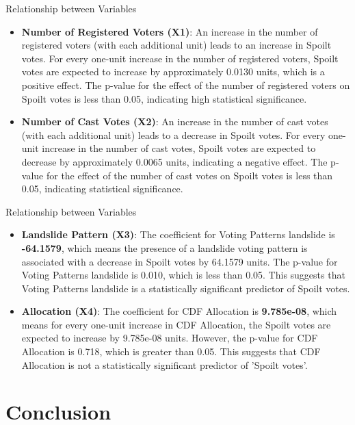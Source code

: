 \documentclass{beamer}
\begin{document}
\begin{frame}{Relationship between Variables}
\begin{itemize}
\item \textbf{Number of Registered Voters (X1)}:
An increase in the number of registered voters (with each additional unit) leads to an increase in Spoilt votes. For every one-unit increase in the number of registered voters, Spoilt votes are expected to increase by approximately 0.0130 units, which is a positive effect. The p-value for the effect of the number of registered voters on Spoilt votes is less than 0.05, indicating high statistical significance.
\item \textbf{Number of Cast Votes (X2)}:
An increase in the number of cast votes (with each additional unit) leads to a decrease in Spoilt votes. For every one-unit increase in the number of cast votes, Spoilt votes are expected to decrease by approximately 0.0065 units, indicating a negative effect. The p-value for the effect of the number of cast votes on Spoilt votes is less than 0.05, indicating statistical significance.
\end{itemize}
\end{frame}

\begin{frame}{Relationship between Variables}
\begin{itemize}
\item \textbf{Landslide Pattern (X3)}: The coefficient for Voting Patterns landslide is \textbf{-64.1579}, which means the presence of a landslide voting pattern is associated with a decrease in Spoilt votes by 64.1579 units. The p-value for Voting Patterns landslide is 0.010, which is less than 0.05. This suggests that Voting Patterns landslide is a statistically significant predictor of Spoilt votes.
\item \textbf{Allocation (X4)}: The coefficient for CDF Allocation is \textbf{9.785e-08}, which means for every one-unit increase in CDF Allocation, the Spoilt votes are expected to increase by 9.785e-08 units. However, the p-value for CDF Allocation is 0.718, which is greater than 0.05. This suggests that CDF Allocation is not a statistically significant predictor of 'Spoilt votes'.
\end{itemize}
\end{frame}



\section{Conclusion}
\end{document}
